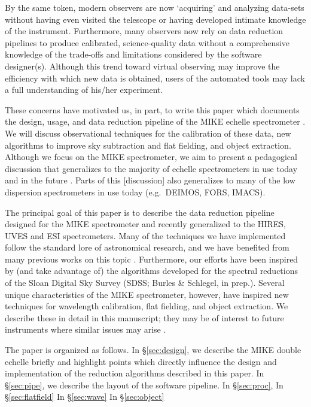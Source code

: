 \documentclass[12pt,preprint]{aastex}
\begin{document}
By the same token, modern observers are now `acquiring' and analyzing
data-sets without having even visited the telescope or having
developed intimate knowledge of the instrument.
Furthermore,  many observers now rely on data reduction pipelines
to produce calibrated, science-quality data without a comprehensive
knowledge of the trade-offs and limitations considered by the
software designer(s).  Although this trend toward virtual observing
may improve the efficiency with which new data is obtained, 
users of the automated tools may lack a full understanding of 
his/her experiment.

These concerns have motivated us, in part, to write this paper
which documents the design, usage, and data reduction pipeline
of the MIKE echelle spectrometer \citep{mike}.  
We will discuss observational techniques for the calibration
of these data, new algorithms to improve sky subtraction and
flat fielding, and object extraction.
Although we focus on the MIKE spectrometer, we aim to present
a pedagogical discussion that generalizes to the majority of 
echelle spectrometers in use today and in the future
\citep[e.g.\ HIRES, UVES;][]{vogt94,uves}.
Parts of this [discussion] also generalizes to many of the low
dispersion spectrometers in use today (e.g.\ DEIMOS, FORS, IMACS).

The principal goal of this paper is to describe the data reduction pipeline
designed for the MIKE spectrometer and recently generalized
to the HIRES, UVES and ESI spectrometers.  Many of the techniques
we have implemented follow the standard lore of astronomical
research, and we have benefited from many previous
works on this topic \citep[e.g.][]{church,kelson03}.
Furthermore, our efforts have been inspired by (and take advantage of)
the algorithms developed for the spectral reductions of the 
Sloan Digital Sky Survey (SDSS; Burles \& Schlegel, in prep.).
Several unique characteristics of the MIKE spectrometer,
however, have inspired new techniques for wavelength calibration,
flat fielding, and object extraction.
We describe these in detail in this manuscript; 
they may be of interest to future instruments
where similar issues may arise \citep[e.g.\ X-shooter;][]{xshooter}.

The paper is organized as follows.  In \S \ref{sec:design}, we
describe the MIKE double echelle briefly and highlight points which
directly influence the design and implementation of the reduction 
algorithms described in this paper.
In  \S \ref{sec:pipe}, we describe the layout of the software pipeline.
In  \S \ref{sec:proc},  
In  \S \ref{sec:flatfield}
In  \S \ref{sec:wave}
In  \S \ref{sec:object}
\end{document}
